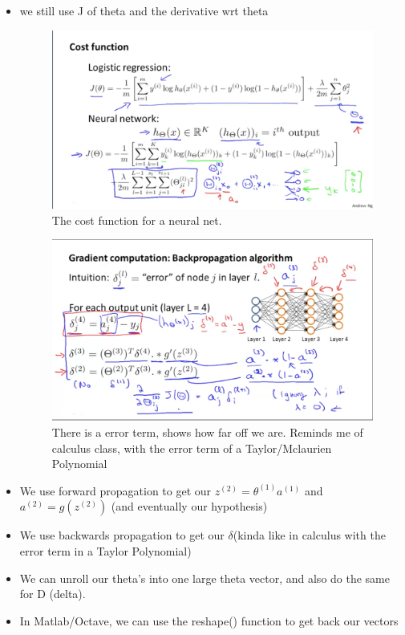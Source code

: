 \documentclass[]{article}
\begin{document}
\begin{itemize}
		\item we still use J of theta and the derivative wrt theta
		\begin{figure}[ht!]
			\includegraphics[width= 1.5\textwidth,center]{Cost_Function_neural_net.png}
			\caption{The cost function for a neural net.}
		\end{figure}
		
		\begin{figure}[ht!]
			\includegraphics[width= 1.5\textwidth,center]{delta_error_term.png}
			\caption{There is a error term, shows how far off we are. Reminds me of calculus class, with the error term of a Taylor/Mclaurien Polynomial}
		\end{figure}
		
		\clearpage
		
		\item We use forward propagation to get our $z^{(2)} = \theta^{(1)}a^{(1)}$ and $a^{(2)}= g(z^{(2)})$ (and eventually our hypothesis)
		\item We use backwards propagation to get our $\delta$(kinda like in calculus with the error term in a Taylor Polynomial)
		\item We can unroll our theta's into one large theta vector, and also do the same for D (delta).
		\item In Matlab/Octave, we can use the reshape() function to get back our vectors
		
	\end{itemize}
	
\end{document}
